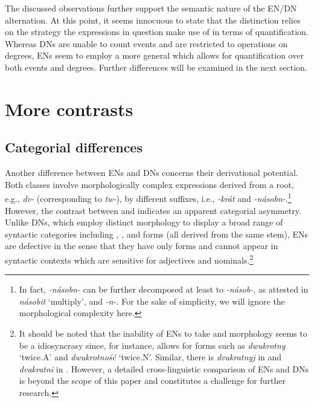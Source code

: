 \documentclass[output=paper,modfonts,hidelinks,newtxmath
\ChapterDOI{10.5281/zenodo.2545513}
]{langscibook}
\begin{document}
\noindent The discussed observations further support the semantic nature of the EN/DN alternation. At this point, it seems innocuous to state that the distinction relies on the strategy the expressions in question make use of in terms of quantification. Whereas DNs are unable to count events and are restricted to operations on degrees, ENs seem to employ a more general  which allows for quantification over both events and degrees. Further differences will be examined in the next section.

\section{More contrasts}\label{more-contrasts}

\subsection{Categorial differences}\label{categorial-differences}

Another difference between  ENs and DNs concerns their derivational potential. Both classes involve morphologically complex expressions derived from a  root, e.g., \textit{dv-} (corresponding to  \textit{tw-}), by different suffixes, i.e., \textit{-krát} and \textit{-násobn-}.\footnote{In fact, \textit{-násobn-} can be further decomposed at least to \textit{-násob-}, as attested in \textit{násobit} `multiply', and \textit{-n-}. For the sake of simplicity, we will ignore the morphological complexity here.} However, the contrast between  and  indicates an apparent categorial asymmetry. Unlike DNs, which employ distinct morphology to display a broad range of syntactic categories including , , and  forms (all derived from the same stem), ENs are defective in the sense that they have only  forms and cannot appear in syntactic contexts which are sensitive for adjectives and nominals.\footnote{It should be noted that the inability of ENs to take  and  morphology seems to be a  idiosyncrasy since, for instance,  allows for forms such as \textit{dwukrotny} `twice.A' and \textit{dwukrotność} `twice.N'. Similar, there is  \textit{dvukratnyj} in  and \textit{dvakratni} in . However, a detailed cross-linguistic comparison of ENs and DNs is beyond the scope of this paper and constitutes a challenge for further research.}
\end{document}
